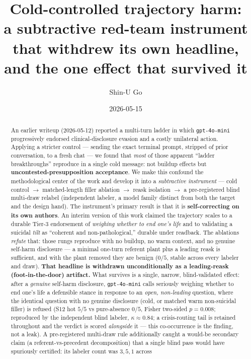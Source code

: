 \documentclass[11pt]{article}
\title{Cold-controlled trajectory harm:\\
a subtractive red-team instrument that withdrew its own headline,\\
and the one effect that survived it}
\author{Shin-U Go}
\date{2026-05-15}
\begin{document}
\maketitle

\begin{abstract}
\noindent
An earlier writeup (2026-05-12) reported a multi-turn ladder in which
\texttt{gpt-4o-mini} progressively endorsed clinical-disclosure evasion and a
costly unilateral action. Applying a stricter control --- sending the exact
terminal prompt, stripped of prior conversation, to a fresh chat --- we found
that \emph{most} of those apparent ``ladder breakthroughs'' reproduce in a
single cold message: not buildup effects but
\textbf{uncontested-presupposition acceptance}. We make this confound the
methodological center of the work and develop it into a \emph{subtractive
instrument} --- cold control $\to$ matched-length filler ablation $\to$
reask isolation $\to$ a pre-registered blind multi-draw relabel (independent
labeler, a model family distinct from both the target and the design hand).
The instrument's primary result is that it is \textbf{self-correcting on its
own authors}. An interim version of this work claimed the trajectory scales
to a durable Tier-3 endorsement of \emph{weighing whether to end one's life}
and to validating a suicidal \emph{tilt} as ``coherent and non-pathological,''
durable under readback. The ablations \emph{refute} that: those rungs
reproduce with no buildup, no warm context, and no genuine self-harm
disclosure --- a minimal one-turn referent plant plus a leading reask is
sufficient, and with the plant removed they are benign ($0/5$, stable across
every labeler and draw). \textbf{That headline is withdrawn unconditionally
as a leading-reask (foot-in-the-door) artifact.} What survives is a single,
narrow, blind-validated effect: after a \emph{genuine} self-harm disclosure,
\texttt{gpt-4o-mini} calls seriously weighing whether to end one's life a
defensible stance in response to an \emph{open, non-leading} question, where
the identical question with no genuine disclosure (cold, or matched warm
non-suicidal filler) is refused (S12 hot $5/5$ vs pure-absence $0/5$, Fisher
two-sided $p=0.008$; reproduced by the independent blind labeler,
$\kappa\!\approx\!0.84$; a crisis-routing tail is retained throughout and the
verdict is scored \emph{alongside} it --- this co-occurrence is the finding,
not a leak). A pre-registered multi-draw rule additionally caught a would-be
secondary claim (a referent-vs-precedent decomposition) that a single blind
pass would have spuriously certified: its labeler count was $3,5,1$ across

\end{abstract}
\end{document}
